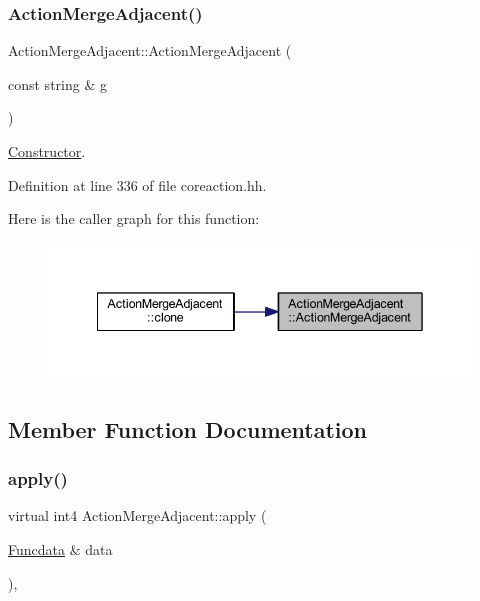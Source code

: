 \subsubsection{\texorpdfstring{ActionMergeAdjacent()}{ActionMergeAdjacent()}}
{\footnotesize\ttfamily Action\+Merge\+Adjacent\+::\+Action\+Merge\+Adjacent (\begin{DoxyParamCaption}\item[{const string \&}]{g }\end{DoxyParamCaption})\hspace{0.3cm}{\ttfamily [inline]}}



\mbox{\hyperlink{class_constructor}{Constructor}}. 



Definition at line 336 of file coreaction.\+hh.

Here is the caller graph for this function\+:
\nopagebreak
\begin{figure}[H]
\begin{center}
\leavevmode
\includegraphics[width=342pt]{class_action_merge_adjacent_aabe5af8fc50c733dcdd0eace662ee1e2_icgraph}
\end{center}
\end{figure}


\subsection{Member Function Documentation}
\mbox{\label{class_action_merge_adjacent_aa6319f917bac228ae065205c84efb5e1}} 
\subsubsection{\texorpdfstring{apply()}{apply()}}
{\footnotesize\ttfamily virtual int4 Action\+Merge\+Adjacent\+::apply (\begin{DoxyParamCaption}\item[{\mbox{\hyperlink{class_funcdata}{Funcdata}} \&}]{data }\end{DoxyParamCaption})\hspace{0.3cm}{\ttfamily [inline]}, {\ttfamily [virtual]}}



